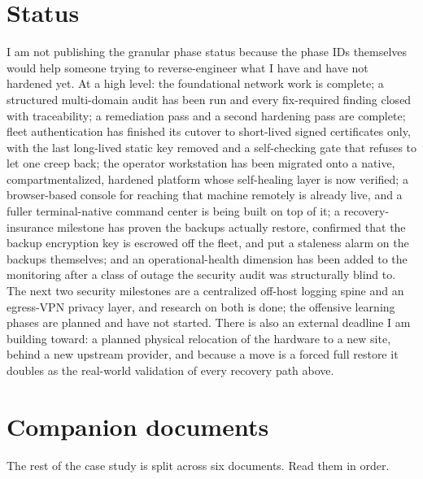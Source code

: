 \documentclass[12pt]{article}
\begin{document}
\section{Status}

I am not publishing the granular phase status because the phase IDs themselves would help someone trying to reverse-engineer what I have and have not hardened yet. At a high level: the foundational network work is complete; a structured multi-domain audit has been run and every fix-required finding closed with traceability; a remediation pass and a second hardening pass are complete; fleet authentication has finished its cutover to short-lived signed certificates only, with the last long-lived static key removed and a self-checking gate that refuses to let one creep back; the operator workstation has been migrated onto a native, compartmentalized, hardened platform whose self-healing layer is now verified; a browser-based console for reaching that machine remotely is already live, and a fuller terminal-native command center is being built on top of it; a recovery-insurance milestone has proven the backups actually restore, confirmed that the backup encryption key is escrowed off the fleet, and put a staleness alarm on the backups themselves; and an operational-health dimension has been added to the monitoring after a class of outage the security audit was structurally blind to. The next two security milestones are a centralized off-host logging spine and an egress-VPN privacy layer, and research on both is done; the offensive learning phases are planned and have not started. There is also an external deadline I am building toward: a planned physical relocation of the hardware to a new site, behind a new upstream provider, and because a move is a forced full restore it doubles as the real-world validation of every recovery path above.

\section{Companion documents}

The rest of the case study is split across six documents. Read them in order.
\end{document}
